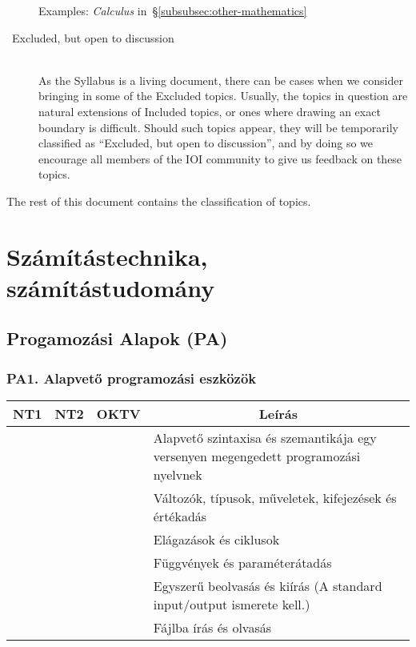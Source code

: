 \documentclass[a4paper,11pt,oneside]{article}
\newcommand{\cmark}{\ding{51}}%
\newcommand{\xmark}{\ding{55}}%
\newcommand{\cincl}{{\small\cmark}}
\newcommand{\cemay}{{\small\xmark\faQuestionCircle}}
\newcommand{\ctable}[1]{
    \begin{center}
        \begin{longtable}{ | C | C | C | m{8cm} | }
        \hline
        \textbf{NT1} & \textbf{NT2} & \textbf{OKTV} & \multicolumn{1}{|c|}{\textbf{Leírás}} \\ \hline
        \endhead
        #1
        \end{longtable}
    \end{center}
}
\begin{document}
\begin{description}
    Examples: \emph{Calculus\/} in~\S\ref{subsubsec:other-mathematics}

\item[\cemay\ Excluded, but open to discussion]~\\
    As the Syllabus is a living document, there can be cases when we consider
    bringing in some of the Excluded topics. Usually, the topics in question
    are natural extensions of Included topics, or ones where drawing an exact
    boundary is difficult. Should such topics appear, they will be temporarily
    classified as ``Excluded, but open to discussion'', and by doing so we encourage 
    all members of the IOI community to give us feedback on these topics.
\end{description}

\bigskip

\noindent
The rest of this document contains the classification of topics.


\section {Számítástechnika, számítástudomány} %
\label{subsec:computing-science}

\subsection {Progamozási Alapok (PA)} %
\label{subsubsec:PF}

\subsubsection*{PA1. Alapvető programozási eszközök} %

\ctable {
    \cincl & \cincl & \cincl & Alapvető szintaxisa és szemantikája egy versenyen megengedett programozási nyelvnek
    \\ \hline %
    \cincl & \cincl & \cincl & Változók, típusok, műveletek, kifejezések és értékadás
    \\ \hline %
    \cincl & \cincl & \cincl & Elágazások és ciklusok
    \\ \hline %
    \cincl & \cincl & \cincl & Függvények és paraméterátadás
    \\ \hline %
    \cincl & \cincl & \cincl & Egyszerű beolvasás és kiírás (A standard input/output ismerete kell.)
    \\ \hline %
    \cemay & \cemay & \cemay & Fájlba írás és olvasás
    \\ \hline
}
\end{document}
